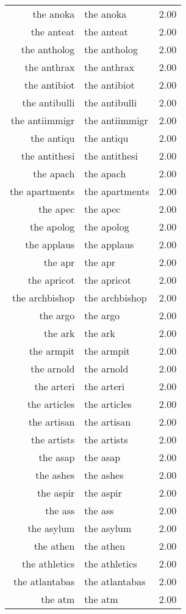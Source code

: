 \begin{table}[ht]
\begin{tabular}{rlr}
  the anoka & the anoka & 2.00 \\ 
  the anteat & the anteat & 2.00 \\ 
  the antholog & the antholog & 2.00 \\ 
  the anthrax & the anthrax & 2.00 \\ 
  the antibiot & the antibiot & 2.00 \\ 
  the antibulli & the antibulli & 2.00 \\ 
  the antiimmigr & the antiimmigr & 2.00 \\ 
  the antiqu & the antiqu & 2.00 \\ 
  the antithesi & the antithesi & 2.00 \\ 
  the apach & the apach & 2.00 \\ 
  the apartments & the apartments & 2.00 \\ 
  the apec & the apec & 2.00 \\ 
  the apolog & the apolog & 2.00 \\ 
  the applaus & the applaus & 2.00 \\ 
  the apr & the apr & 2.00 \\ 
  the apricot & the apricot & 2.00 \\ 
  the archbishop & the archbishop & 2.00 \\ 
  the argo & the argo & 2.00 \\ 
  the ark & the ark & 2.00 \\ 
  the armpit & the armpit & 2.00 \\ 
  the arnold & the arnold & 2.00 \\ 
  the arteri & the arteri & 2.00 \\ 
  the articles & the articles & 2.00 \\ 
  the artisan & the artisan & 2.00 \\ 
  the artists & the artists & 2.00 \\ 
  the asap & the asap & 2.00 \\ 
  the ashes & the ashes & 2.00 \\ 
  the aspir & the aspir & 2.00 \\ 
  the ass & the ass & 2.00 \\ 
  the asylum & the asylum & 2.00 \\ 
  the athen & the athen & 2.00 \\ 
  the athletics & the athletics & 2.00 \\ 
  the atlantabas & the atlantabas & 2.00 \\ 
  the atm & the atm & 2.00 \\ 

\end{tabular}
\end{table}

